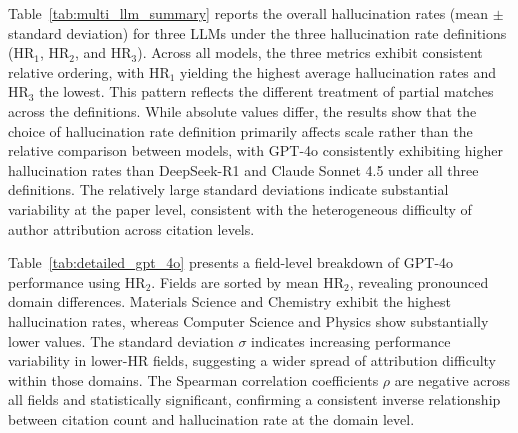 \documentclass[11pt]{article}
\begin{document}
Table~\ref{tab:multi_llm_summary} reports the overall hallucination rates (mean $\pm$ standard deviation) for three LLMs under the three hallucination rate definitions (HR$_1$, HR$_2$, and HR$_3$). Across all models, the three metrics exhibit consistent relative ordering, with HR$_1$ yielding the highest average hallucination rates and HR$_3$ the lowest. This pattern reflects the different treatment of partial matches across the definitions. While absolute values differ, the results show that the choice of hallucination rate definition primarily affects scale rather than the relative comparison between models, with GPT-4o consistently exhibiting higher hallucination rates than DeepSeek-R1 and Claude Sonnet 4.5 under all three definitions. The relatively large standard deviations indicate substantial variability at the paper level, consistent with the heterogeneous difficulty of author attribution across citation levels.

\begin{table}[htbp]
  \centering
  \normalsize

  \caption{Overall Hallucination Rate (Mean $\pm$ SD) by LLM.}
  \label{tab:multi_llm_summary}
\end{table}

Table~\ref{tab:detailed_gpt_4o} presents a field-level breakdown of GPT-4o performance using HR$_2$. Fields are sorted by mean HR$_2$, revealing pronounced domain differences. Materials Science and Chemistry exhibit the highest hallucination rates, whereas Computer Science and Physics show substantially lower values. The standard deviation $\sigma$ indicates increasing performance variability in lower-HR fields, suggesting a wider spread of attribution difficulty within those domains. The Spearman correlation coefficients $\rho$ are negative across all fields and statistically significant, confirming a consistent inverse relationship between citation count and hallucination rate at the domain level.
\end{document}
